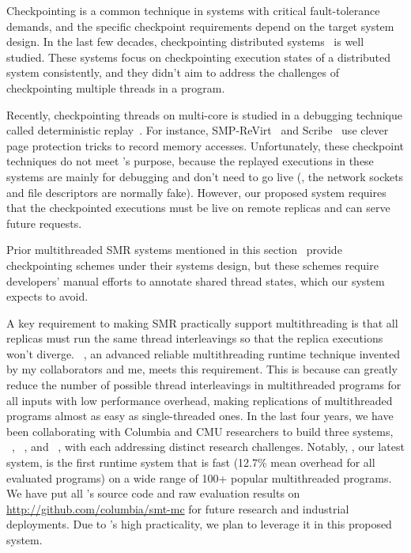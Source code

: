  Checkpointing is a common technique in
systems with critical fault-tolerance demands, and the specific checkpoint
requirements depend on the target system design. In the last few decades,
checkpointing distributed systems~\cite{beguelin:jpdc97, dejavu:ipdps07,
dmtcp:ipdps09, oren:atc07} is well studied. These systems focus on checkpointing
execution states of a distributed system consistently, and they didn't aim to
address the challenges of checkpointing multiple threads in a program.

Recently, checkpointing threads on multi-core is studied in a debugging
technique called deterministic
replay~\cite{smp-revirt:vee08,pres:sosp09,odr:sosp09,scribe:sigmetrics10,
capo:asplos09}.
For instance, SMP-ReVirt~\cite{smp-revirt:vee08} and
Scribe~\cite{scribe:sigmetrics10} use clever page protection tricks to record
memory accesses. Unfortunately, these checkpoint techniques do not meet \crane's
purpose, because the replayed executions in these systems are mainly for
debugging and don't need to go live (\eg, the network sockets and file
descriptors are normally fake). However, our proposed \crane system requires
that the checkpointed executions must be live on remote replicas and can serve
future requests.

Prior multithreaded SMR systems mentioned in this section~\cite{eve:osdi12,
rex:eurosys14} provide checkpointing schemes under their systems design, but
these schemes require developers' manual efforts to annotate shared thread
states, which our \crane system expects to avoid.


A key requirement to making SMR practically support multithreading is that all
replicas must run the same thread interleavings so that the replica executions
won't diverge. \smt~\cite{smt:cacm}, an advanced reliable multithreading
runtime technique invented by my collaborators and me, meets this requirement.
This is because \smt can greatly reduce the number of possible thread
interleavings in multithreaded programs for all inputs with low performance
overhead, making replications of multithreaded programs almost as easy as
single-threaded ones. In the last four years, we have been collaborating with
Columbia and CMU researchers to build three \smt systems,
\tern~\cite{cui:tern:osdi10}, \peregrine~\cite{peregrine:sosp11}, and
\parrot~\cite{parrot:sosp13}, with each addressing distinct research challenges.
Notably, \parrot, our latest system, is the first \smt runtime system that is
fast (12.7\% mean overhead for all evaluated programs) on a wide range of 100+
popular multithreaded programs. We have 
put all \parrot's source code and raw evaluation results on
\url{http://github.com/columbia/smt-mc} for future research and industrial
deployments. Due to \parrot's high practicality, we plan to leverage it in this
proposed \crane system.

